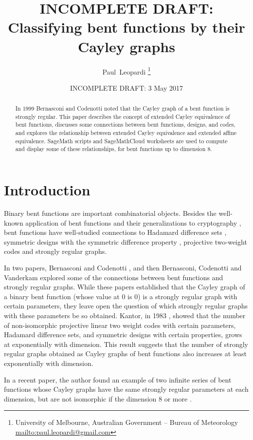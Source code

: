 \documentclass[12pt,a4paper]{article}
\title{INCOMPLETE DRAFT: \\
Classifying bent functions by their Cayley graphs}
\author{
Paul~Leopardi
\thanks{University of Melbourne, Australian Government -- Bureau of Meteorology
\protect\url{mailto:paul.leopardi@gmail.com}}
}
\date{INCOMPLETE DRAFT: 3 May 2017}
\begin{document}
\maketitle

\begin{abstract}
%
In 1999 Bernasconi and Codenotti noted that the Cayley graph of a bent function is strongly regular.
This paper describes the concept of extended Cayley equivalence of bent functions,
discusses some connections between bent functions, designs, and codes,
and explores the relationship between extended Cayley equivalence and extended affine equivalence.
SageMath scripts and SageMathCloud worksheets are used to compute and display some of these relationships,
for bent functions up to dimension 8.
%
\end{abstract}

\section{Introduction}
\label{sec-Introduction}
Binary bent functions are important combinatorial objects.
Besides the well-known application of bent functions and their generalizations to cryptography
\cite{Ada97} \cite[4.1-4.6]{Tok15bent},
bent functions have well-studied connections to Hadamard difference sets \cite{Dil74},
symmetric designs with the symmetric difference property \cite{DilS87block,Kan75symplectic},
projective two-weight codes \cite{DinD15class} and strongly regular graphs.

In two papers, Bernasconi and Codenotti \cite{BerC99}, and then Bernasconi, Codenotti and Vanderkam
\cite{BerCV01} explored some of the connections
between bent functions and strongly regular graphs.
While these papers established that the Cayley graph of a binary bent function (whose value at 0 is
0) is a strongly regular graph
with certain parameters, they leave open the question of which strongly regular graphs with these
parameters  be so obtained.
Kantor, in 1983 \cite{Kan83exponential}, showed that the number of non-isomorphic projective linear
two weight codes with certain parameters,
Hadamard difference sets, and symmetric designs with certain properties, grows at exponentially
with dimension.
This result suggests that the number of strongly regular graphs obtained as Cayley graphs of bent
functions also increases at least exponentially with dimension.

In a recent paper, the author found an example of two infinite series of bent functions whose
Cayley graphs have the same strongly regular parameters at each dimension,
but are not isomorphic if the dimension 8 or more \cite{Leo17Hurwitz}.
\end{document}
